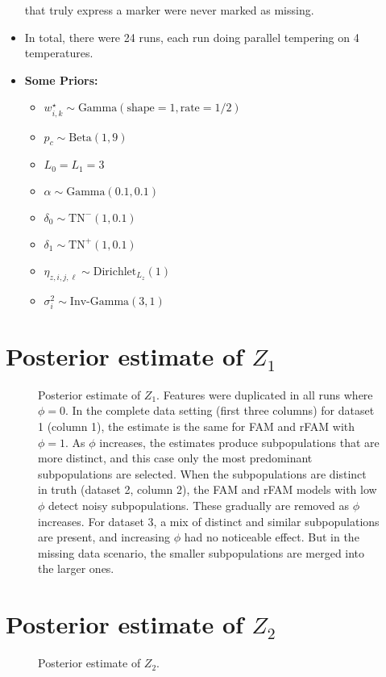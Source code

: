 \documentclass[10pt]{article} %
\newcommand{\Gam}{ \text{Gamma} }
\newcommand{\InvGamma}{ \text{Inv-Gamma} }
\def\Dir{\text{Dirichlet}}
\def\TN{\text{TN}}
\def\imscale{.16}
\begin{document}
\begin{itemize}
        that truly express a marker were never marked as missing.
  \item In total, there were 24 runs, each run doing parallel tempering on 4
        temperatures.
  \item \textbf{Some Priors:}
  \begin{itemize}
    \item $w^\star_{i,k} \sim \Gam(\text{shape}=1, \text{rate}=1/2)$
    \item $p_c \sim \text{Beta}(1, 9)$
    \item $L_0=L_1=3$
    \item $\alpha \sim \Gam(0.1, 0.1)$
    \item $\delta_0 \sim \TN^-(1, 0.1)$
    \item $\delta_1 \sim \TN^+(1, 0.1)$
    \item $\eta_{z, i,j,\ell} \sim \Dir_{L_z}(1)$
    \item $\sigma^2_i \sim \InvGamma(3, 1)$
  \end{itemize}
\end{itemize}


\newpage
\section{Posterior estimate of $Z_1$}
\begin{figure}[H]
  \begin{center}  %
    \imgtemplate{Z1.pdf}{\imscale}
  \end{center}
  \caption{Posterior estimate of $Z_1$. Features were duplicated in all runs
  where $\phi=0$. In the complete data setting (first three columns) for
  dataset 1 (column 1), the estimate is the same for FAM and rFAM with
  $\phi=1$. As $\phi$ increases, the estimates produce subpopulations that
  are more distinct, and this case only the most predominant subpopulations
  are selected. When the subpopulations are distinct in truth (dataset 2,
  column 2), the FAM and rFAM models with low $\phi$ detect noisy
  subpopulations. These gradually are removed as $\phi$ increases. For dataset 3,
  a mix of distinct and similar subpopulations are present, and increasing $\phi$
  had no noticeable effect. But in the missing data scenario, the smaller subpopulations
  are merged into the larger ones.}
  \label{fig:z1est}
\end{figure}

\newpage
\section{Posterior estimate of $Z_2$}
\begin{figure}[H]
  \begin{center}  %
    \imgtemplate{Z2.pdf}{\imscale}
  \end{center}
  \caption{Posterior estimate of $Z_2$.}
  \label{fig:z2est}
\end{figure}
\end{document}
